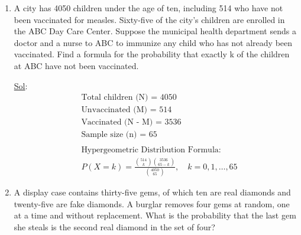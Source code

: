 \begin{enumerate}
    \underline{Sol}:\\
    $$
    \begin{aligned}
      & \text{Total members: } N = 12 \\
      & \text{Accountants: } k = 4 \\
      & \text{Non-accountants: } N - k = 8 \\
      & \text{Committee size: } n = 5 \\
      \\
      & P(X = 2) = \frac{\binom{4}{2} \binom{8}{3}}{\binom{12}{5}} \\
      & \binom{4}{2} = \frac{4 \times 3}{2 \times 1} = 6 \\
      & \binom{8}{3} = \frac{8 \times 7 \times 6}{3 \times 2 \times 1} = 56 \\
      & \binom{12}{5} = \frac{12 \times 11 \times 10 \times 9 \times
      8}{5 \times 4 \times 3 \times 2 \times 1} = 792 \\
      \\
      & P(X = 2) = \frac{6 \times 56}{792} = \frac{336}{792} \approx
      \boxed{0.4242}
    \end{aligned}$$

  \item[22.] A city has 4050 children under the age of ten, including
    514 who have not been vaccinated for measles. Sixty-five of the
    city’s children are enrolled in the ABC Day Care Center. Suppose
    the municipal health department sends a doctor and a nurse to ABC
    to immunize any child who has not already been vaccinated. Find a
    formula for the probability that exactly k of the children at ABC
    have not been vaccinated.

    \underline{Sol}:\\
    $$
    \begin{aligned}
      & \text{Total children (N) = 4050} \\
      & \text{Unvaccinated (M) = 514} \\
      & \text{Vaccinated (N - M) = 3536} \\
      & \text{Sample size (n) = 65} \\
      \\
      & \text{Hypergeometric Distribution Formula:} \\
      & \boxed{P(X = k) = \frac{\binom{514}{k}
      \binom{3536}{65-k}}{\binom{4050}{65}}, \quad k = 0, 1, \dots, 65}
    \end{aligned}$$

  \item[27.] A display case contains thirty-five gems, of which ten
    are real diamonds and twenty-five are fake diamonds. A burglar
    removes four gems at random, one at a time and without
    replacement. What is the probability that the last gem she steals
    is the second real diamond in the set of four?


\end{enumerate}

